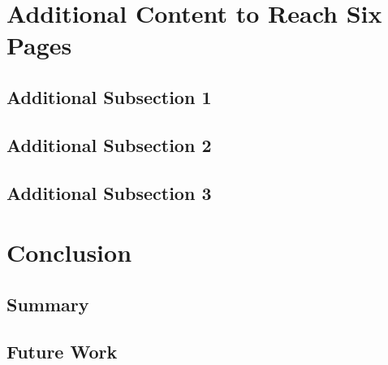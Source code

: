 \documentclass[12pt]{article}
\begin{document}
\newpage

\section{Additional Content to Reach Six Pages}
\subsection{Additional Subsection 1}
\lipsum[29-32]

\subsection{Additional Subsection 2}
\lipsum[33-36]

\subsection{Additional Subsection 3}
\lipsum[37-40]

\section{Conclusion}
\subsection{Summary}
\lipsum[41-44]

\subsection{Future Work}
\lipsum[45-48]
\end{document}
